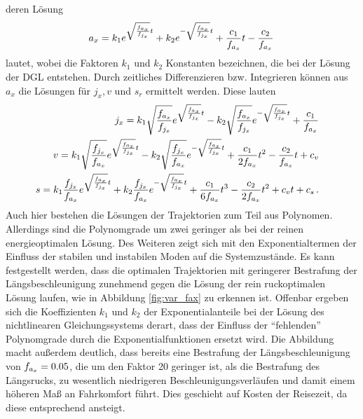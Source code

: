 deren Lösung
\begin{equation}
a_x = k_1e^{\sqrt{\frac{f_{a_x}}{f_{j_x}}}t} + k_2e^{-\sqrt{\frac{f_{a_x}}{f_{j_x}}}t} + \frac{c_1}{f_{a_x}}t - \frac{c_2}{f_{a_x}} \, \label{eq:DGL_ax_Lösung}
\end{equation}
lautet, wobei die Faktoren $k_1$ und $k_2$ Konstanten bezeichnen, die bei der Lösung der \gls{DGL} entstehen. Durch zeitliches Differenzieren bzw. Integrieren können aus $a_x$ die Lösungen für $j_x, v$ und $s_r$ ermittelt werden. Diese lauten
\begin{align}
\begin{split}
j_x &= k_1\sqrt{\frac{f_{a_x}}{f_{j_x}}}e^{\sqrt{\frac{f_{a_x}}{f_{j_x}}}t} - k_2\sqrt{\frac{f_{a_x}}{f_{j_x}}}e^{-\sqrt{\frac{f_{a_x}}{f_{j_x}}}t} + \frac{c_1}{f_{a_x}} \label{eq:DGL_jx_Lösung}
\end{split}
\\
\begin{split}
v &= k_1\sqrt{\frac{f_{j_x}}{f_{a_x}}}e^{\sqrt{\frac{f_{a_x}}{f_{j_x}}}t} - k_2\sqrt{\frac{f_{j_x}}{f_{a_x}}}e^{-\sqrt{\frac{f_{a_x}}{f_{j_x}}}t} + \frac{c_1}{2f_{a_x}}t^2 - \frac{c_2}{f_{a_x}}t + c_v
\end{split}
\\
\begin{split}
s &= k_1\frac{f_{j_x}}{f_{a_x}}e^{\sqrt{\frac{f_{a_x}}{f_{j_x}}}t} + k_2\frac{f_{j_x}}{f_{a_x}}e^{-\sqrt{\frac{f_{a_x}}{f_{j_x}}}t} + \frac{c_1}{6f_{a_x}}t^3 - \frac{c_2}{2f_{a_x}}t^2 + c_vt + c_s \,.
\end{split}
\end{align}
Auch hier bestehen die Lösungen der Trajektorien zum Teil aus Polynomen. Allerdings sind die Polynomgrade um zwei geringer als bei der reinen energieoptimalen Lösung. Des Weiteren zeigt sich mit den Exponentialtermen der Einfluss der stabilen und instabilen Moden auf die Systemzustände. Es kann festgestellt werden, dass die optimalen Trajektorien mit geringerer Bestrafung der Längsbeschleunigung zunehmend gegen die Lösung der rein ruckoptimalen Lösung laufen, wie in Abbildung \ref{fig:var_fax} zu erkennen ist. Offenbar ergeben sich die Koeffizienten $k_1$ und $k_2$ der Exponentialanteile bei der Lösung des nichtlinearen Gleichungssystems derart, dass der Einfluss der ``fehlenden'' Polynomgrade durch die Exponentialfunktionen ersetzt wird. Die Abbildung macht außerdem deutlich, dass bereits eine Bestrafung der Längsbeschleunigung von $f_{a_x} = 0.05$, die um den Faktor 20 geringer ist, als die Bestrafung des Längsrucks, zu wesentlich niedrigeren Beschleunigungsverläufen und damit einem höheren Maß an Fahrkomfort führt. Dies geschieht auf Kosten der Reisezeit, da diese entsprechend ansteigt. 
